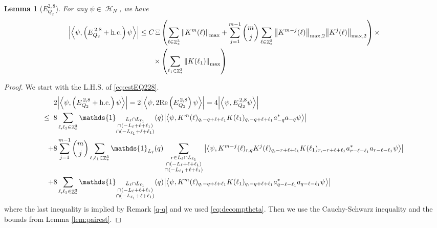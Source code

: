 \documentclass[sn-mathphys, Numbered ,a4paper]{sn-jnl}%
\DeclareMathOperator{\Z}{\mathbb{Z}}
\DeclareMathOperator{\HH}{\mathcal{H}}
\newcommand{\eva}[1]{\left\langle #1 \right\rangle}
\theoremstyle{plain}
\newtheorem{lemma}[theorem]{Lemma}
\theoremstyle{definition}
\theoremstyle{remark}
\theoremstyle{plain}
\theoremstyle{definition}
\theoremstyle{remark}
\begin{document}
\begin{lemma}[$E_{Q_2}^{2,8}$]
For any $\psi \in \HH_N$, we have
\begin{align}
	\abs{\eva{\psi,\left(E^{\,2,8}_{Q_2}+\mathrm{h.c.}\right) \psi }}
	\leq  C\, \Xi &\left(\sum\limits_{\ell \in \Z^3_*} \norm{K^m(\ell)}_{\mathrm{max}} + \sum\limits_{j=1}^{m-1} {{m}\choose j} \sum\limits_{ \ell\in \Z^3_*} \norm{K^{m-j}(\ell)}_{\mathrm{max,2}} \norm{K^j(\ell)}_{\mathrm{max,2}} \right) \times \nonumber\\\quad \times &\left(\sum\limits_{\ell_1 \in \Z^3_*} \norm{K(\ell_1)}_{\mathrm{max}}\right) \label{eq:estEQ228}
	\end{align}
\end{lemma}
\begin{proof}
We start with the L.H.S. of \eqref{eq:estEQ228}.
\begin{align}
	&2\abs{\eva{\psi,\left(E^{\,2,8}_{Q_2}+\mathrm{h.c.}\right) \psi }} = 2\abs{\eva{\psi,2\mathrm{Re}\left(E^{\,2,8}_{Q_2}\right) \psi }} = 4\abs{\eva{\psi, E^{\,2,8}_{Q_2} \psi }}\nonumber\\
	\leq\;\;&8 \sum\limits_{\ell, \ell_1\in \Z^3_*} \mathds{1}_{\substack{L_{\ell}\cap L_{\ell_1}\\\cap (-L_{\ell}+\ell+\ell_1) \\ \cap (-L_{\ell_1}+\ell+\ell_1)}}(q) \abs{\eva{\psi, K^m(\ell)_{q,-q+\ell+\ell_1}K(\ell_1)_{q,-q+\ell+\ell_1} a^*_{-q}a_{-q} \psi}} \label{eq:EQ2281}\\
	\;+&8 \sum\limits_{j=1}^{m-1} {{m}\choose j} \sum\limits_{\ell, \ell_1\in \Z^3_*}\mathds{1}_{L_{\ell}}(q) \sum\limits_{\substack{r\in L_{\ell} \cap L_{\ell_1}\\\cap (-L_{\ell}+\ell+\ell_1) \\ \cap (-L_{\ell_1}+\ell+\ell_1)}}  \abs{\eva{\psi, K^{m-j}(\ell)_{r,q} K^j(\ell)_{q,-r+\ell+\ell_1} K(\ell_1)_{r,-r+\ell+\ell_1} a^*_{r-\ell-\ell_1}a_{r-\ell-\ell_1} \psi }} \label{eq:EQ2282}\\
	\;+&8\sum\limits_{\ell, \ell_1\in \Z^3_*} \mathds{1}_{\substack{L_{\ell}\cap L_{\ell_1}\\\cap (-L_{\ell}+\ell+\ell_1) \\ \cap (-L_{\ell_1}+\ell+\ell_1)}}(q)  \abs{\eva{\psi, K^m(\ell)_{q,-q+\ell+\ell_1} K(\ell_1)_{q,-q+\ell+\ell_1} a^*_{q-\ell-\ell_1}a_{q-\ell-\ell_1} \psi}} \label{eq:EQ2283}
\end{align}
where the last inequality is implied by Remark \ref{q-q} and we used \eqref{eq:decomptheta}. Then we use the Cauchy-Schwarz inequality and the bounds from Lemma \ref{lem:pairest}.

\end{proof}
\end{document}
